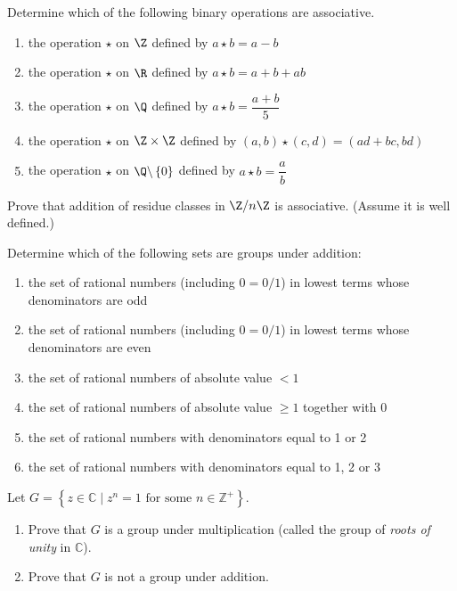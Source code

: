 \def\thetitle{Homework 2}



\begin{questions}
\question Determine which of the following binary operations are associative.
\begin{enumerate}[label=(\alph*)]
    \item the operation \(\star\) on \(\Z\) defined by \(a\star b  = a-b\)
    \item the operation \(\star\) on \(\R\) defined by \(a\star b  = a+b+ab\)
    \item the operation \(\star\) on \(\Q\) defined by \(a\star b  = \dfrac{a+b}{5}\)
    \item the operation \(\star\) on \(\Z\times\Z\) defined by \((a , b) \star (c,d)  = (ad+bc, bd)\)
    \item the operation \(\star\) on \(\Q\backslash\left\{ 0 \right\}\) defined by \(a\star b = \dfrac{a}{b} \)
\end{enumerate}

\question 
Prove that addition of residue classes in \(\Z / n \Z\) is associative. (Assume it is well defined.)


\question
Determine which of the following sets are groups under addition:
\begin{enumerate}[label=(\alph*)]
    \item the set of rational numbers (including \(0=0 / 1\)) in lowest terms whose denominators are odd
    \item the set of rational numbers (including \(0=0 / 1\)) in lowest terms whose denominators are even
    \item the set of rational numbers of absolute value \(<1\)
    \item the set of rational numbers of absolute value \(\geq 1\) together with 0
    \item the set of rational numbers with denominators equal to 1 or 2
    \item the set of rational numbers with denominators equal to 1, 2 or 3 
\end{enumerate}



\question
Let \(G=\left\{z \in \mathbb{C} \mid z^n=1 \text{ for some }n \in \mathbb{Z}^{+}\right\}\).
\begin{enumerate}[label=(\alph*)]
    \item Prove that \(G\) is a group under multiplication (called the group of \textit{roots of unity} in \(\mathbb{C}\)).
    \item Prove that \(G\) is not a group under addition.
\end{enumerate}



\end{questions}
